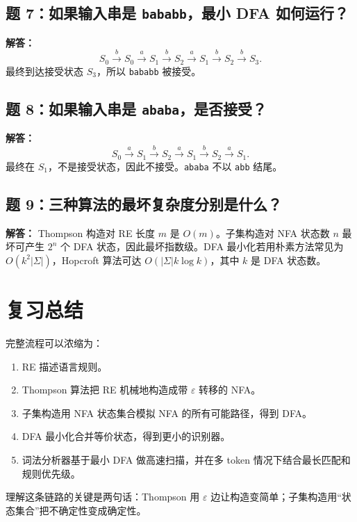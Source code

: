 \documentclass[UTF8,fontset=none,11pt]{ctexart}
\newcommand{\eps}{\varepsilon}
\begin{document}
\subsection*{题 7：如果输入串是 \texttt{bababb}，最小 DFA 如何运行？}

\textbf{解答：}
\[
S_0 \xrightarrow{b} S_0 \xrightarrow{a} S_1 \xrightarrow{b} S_2 \xrightarrow{a} S_1 \xrightarrow{b} S_2 \xrightarrow{b} S_3.
\]
最终到达接受状态 \(S_3\)，所以 \texttt{bababb} 被接受。

\subsection*{题 8：如果输入串是 \texttt{ababa}，是否接受？}

\textbf{解答：}
\[
S_0 \xrightarrow{a} S_1 \xrightarrow{b} S_2 \xrightarrow{a} S_1 \xrightarrow{b} S_2 \xrightarrow{a} S_1.
\]
最终在 \(S_1\)，不是接受状态，因此不接受。\texttt{ababa} 不以 \texttt{abb} 结尾。

\subsection*{题 9：三种算法的最坏复杂度分别是什么？}

\textbf{解答：} Thompson 构造对 RE 长度 \(m\) 是 \(O(m)\)。子集构造对 NFA 状态数 \(n\) 最坏可产生 \(2^n\) 个 DFA 状态，因此最坏指数级。DFA 最小化若用朴素方法常见为 \(O(k^2|\Sigma|)\)，Hopcroft 算法可达 \(O(|\Sigma|k\log k)\)，其中 \(k\) 是 DFA 状态数。

\section*{复习总结}

完整流程可以浓缩为：

\begin{enumerate}
  \item RE 描述语言规则。
  \item Thompson 算法把 RE 机械地构造成带 \(\eps\) 转移的 NFA。
  \item 子集构造用 NFA 状态集合模拟 NFA 的所有可能路径，得到 DFA。
  \item DFA 最小化合并等价状态，得到更小的识别器。
  \item 词法分析器基于最小 DFA 做高速扫描，并在多 token 情况下结合最长匹配和规则优先级。
\end{enumerate}

理解这条链路的关键是两句话：Thompson 用 \(\eps\) 边让构造变简单；子集构造用“状态集合”把不确定性变成确定性。
\end{document}

